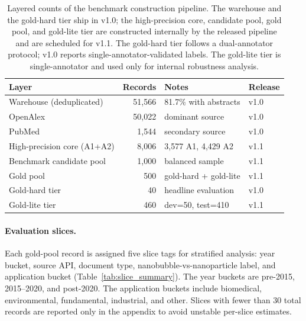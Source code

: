 \documentclass{article}
\begin{document}
\begin{table}[t]
\centering
\caption{Layered counts of the benchmark construction pipeline. The
warehouse and the gold-hard tier ship in v1.0; the high-precision
core, candidate pool, gold pool, and gold-lite tier are constructed
internally by the released pipeline and are scheduled for v1.1.
The gold-hard tier follows a dual-annotator protocol; v1.0 reports
single-annotator-validated labels. The gold-lite tier is single-annotator
and used only for internal robustness analysis.}
\label{tab:warehouse_stats}
\small
\setlength{\tabcolsep}{6pt}
\begin{tabular}{@{}lrll@{}}
\toprule
\textbf{Layer} & \textbf{Records} & \textbf{Notes} & \textbf{Release} \\
\midrule
Warehouse (deduplicated)        & 51{,}566 & 81.7\% with abstracts          & v1.0 \\
\quad OpenAlex                  & 50{,}022 & dominant source                & v1.0 \\
\quad PubMed                    &  1{,}544 & secondary source               & v1.0 \\
High-precision core (A1+A2)     &  8{,}006 & 3{,}577 A1, 4{,}429 A2         & v1.1 \\
Benchmark candidate pool        &  1{,}000 & balanced sample                & v1.1 \\
Gold pool                       &    500 & gold-hard + gold-lite            & v1.1 \\
\quad Gold-hard tier            &     40 & headline evaluation              & v1.0 \\
\quad Gold-lite tier            &    460 & dev=50, test=410                 & v1.1 \\
\bottomrule
\end{tabular}
\end{table}

\paragraph{Evaluation slices.}
Each gold-pool record is assigned five slice tags for stratified analysis: year bucket, source API, document type, nanobubble-vs-nanoparticle label, and application bucket (Table~\ref{tab:slice_summary}). The year buckets are pre-2015, 2015--2020, and post-2020. The application buckets include biomedical, environmental, fundamental, industrial, and other. Slices with fewer than 30 total records are reported only in the appendix to avoid unstable per-slice estimates.
\end{document}
